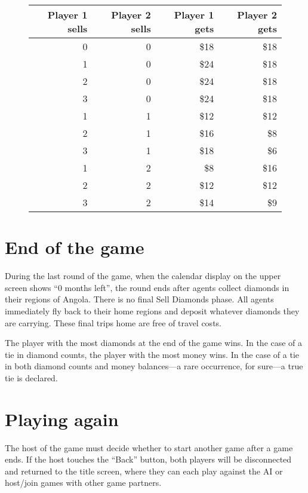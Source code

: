 \documentclass[8pt]{extbook}
\begin{document}
\begin{figure}[t]
\begin{center}
\begin{tabular}{r|r||r|r}
Player 1 sells & Player 2 sells & Player 1 gets & Player 2 gets\\
\hline
\hline
0 & 0 & \$18 & \$18 \\
\hline
1 & 0 & \$24 & \$18 \\
2 & 0 & \$24 & \$18 \\
3 & 0 & \$24 & \$18 \\
\hline
1 & 1 & \$12 & \$12 \\
2 & 1 & \$16 & \$8 \\
3 & 1 & \$18 & \$6 \\
\hline
1 & 2 & \$8 & \$16 \\
2 & 2 & \$12 & \$12 \\
3 & 2 & \$14 & \$9 \\
\end{tabular} 
\end{center}
\label{fig:sellTable}

\end{figure}



\section{End of the game}

During the last round of the game, when the calendar display on the upper screen shows ``0 months left'', the round ends after agents collect diamonds in their regions of Angola.  There is no final Sell Diamonds phase.  All agents immediately fly back to their home regions and deposit whatever diamonds they are carrying.  These final trips home are free of travel costs.

The player with the most diamonds at the end of the game wins.  In the case of a tie in diamond counts, the player with the most money wins.  In the case of a tie in both diamond counts and money balances---a rare occurrence, for sure---a true tie is declared.



\section{Playing again}
The host of the game must decide whether to start another game after a game ends.  If the host touches the ``Back'' button, both players will be disconnected and returned to the title screen, where they can each play against the AI or host/join games with other game partners.
\end{document}
